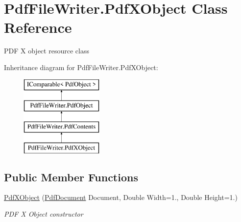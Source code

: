 \hypertarget{class_pdf_file_writer_1_1_pdf_x_object}{}\section{Pdf\+File\+Writer.\+Pdf\+X\+Object Class Reference}
\label{class_pdf_file_writer_1_1_pdf_x_object}


P\+DF X object resource class  


Inheritance diagram for Pdf\+File\+Writer.\+Pdf\+X\+Object\+:\begin{figure}[H]
\begin{center}
\leavevmode
\includegraphics[height=4.000000cm]{class_pdf_file_writer_1_1_pdf_x_object}
\end{center}
\end{figure}
\subsection*{Public Member Functions}
\begin{DoxyCompactItemize}
\item 
\hyperlink{class_pdf_file_writer_1_1_pdf_x_object_a7800f88dc6c56c6d5355d283840aacf2}{Pdf\+X\+Object} (\hyperlink{class_pdf_file_writer_1_1_pdf_document}{Pdf\+Document} Document, Double Width=1., Double Height=1.)
\begin{DoxyCompactList}\small\item\em P\+DF X Object constructor \end{DoxyCompactList}\end{DoxyCompactItemize}
